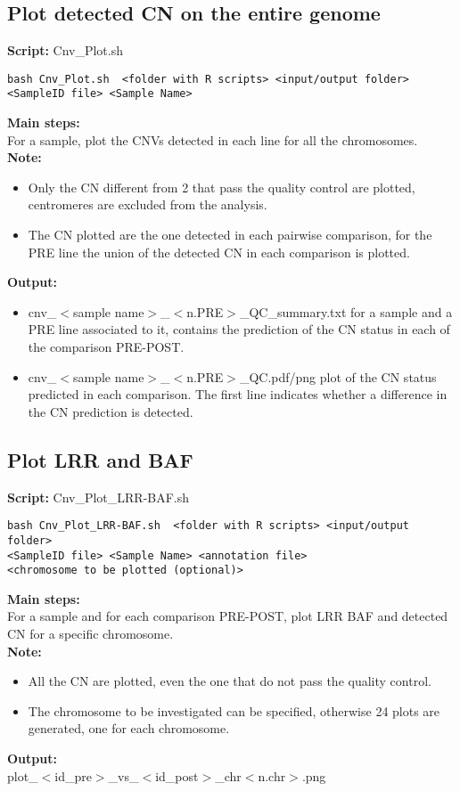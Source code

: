\documentclass[11pt]{paper}
\begin{document}
\subsection{Plot detected CN on the entire genome}
\textbf{Script:} Cnv\_Plot.sh
\begin{verbatim}
bash Cnv_Plot.sh  <folder with R scripts> <input/output folder> 
<SampleID file> <Sample Name>  
\end{verbatim}
\textbf{Main steps:}\\
For a sample, plot the CNVs detected in each line for all the chromosomes.\\
\noindent \textbf{Note:}
\begin{itemize}
\item Only the CN different from 2 that pass the quality control are plotted, centromeres are excluded from the analysis.
\item The CN plotted are the one detected in each pairwise comparison, for the PRE line the union of the detected CN in each comparison is plotted.
\end{itemize}
\noindent \textbf{Output:}
\begin{itemize}
\item cnv\_$<$sample name$>$\_$<$n.PRE$>$\_QC\_summary.txt for a sample and a PRE line associated to it, contains the prediction of the CN status in each of the comparison PRE-POST.
\item cnv\_$<$sample name$>$\_$<$n.PRE$>$\_QC.pdf/png plot of the CN status predicted in each comparison. The first line indicates whether a difference in the CN prediction is detected.
\end{itemize}

\subsection{Plot LRR and BAF}
\textbf{Script:} Cnv\_Plot\_LRR-BAF.sh
\begin{verbatim}
bash Cnv_Plot_LRR-BAF.sh  <folder with R scripts> <input/output folder> 
<SampleID file> <Sample Name> <annotation file> 
<chromosome to be plotted (optional)>  
\end{verbatim}
\textbf{Main steps:}\\
For a sample and for each comparison PRE-POST, plot LRR BAF and detected CN for a specific chromosome.\\
\noindent \textbf{Note:}
\begin{itemize}
\item All the CN are plotted, even the one that do not pass the quality control.
\item The chromosome to be investigated can be specified, otherwise 24 plots are generated, one for each chromosome.
\end{itemize}
\noindent \textbf{Output:}\\
plot\_$<$id\_pre$>$\_vs\_$<$id\_post$>$\_chr$<$n.chr$>$.png
\end{document}
